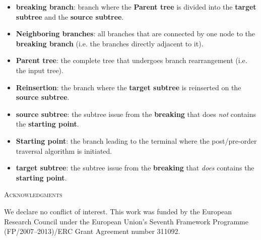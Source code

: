 \documentclass[12pt,letterpaper]{article}
\renewcommand{\section}[1]{%
\bigskip
\begin{center}
\begin{Large}
\normalfont\scshape #1
\medskip
\end{Large}
\end{center}}
\begin{document}
\begin{itemize}
    \item{\textbf{breaking branch}: branch where the \textbf{Parent tree} is divided into the \textbf{target subtree} and the \textbf{source subtree}.}
    \item{\textbf{Neighboring branches}: all branches that are connected by one node to the \textbf{breaking branch} (i.e. the branches directly adjacent to it).}
    \item{\textbf{Parent tree}: the complete tree that undergoes branch rearrangement (i.e. the input tree).}
    \item{\textbf{Reinsertion}: the branch where the \textbf{target subtree} is reinserted on the \textbf{source subtree}.}
    \item{\textbf{source subtree}: the subtree issue from the \textbf{breaking} that does \textit{not} contains the \textbf{starting point}.}
    \item{\textbf{Starting point}: the branch leading to the terminal where the post/pre-order traversal algorithm is initiated.}
    \item{\textbf{target subtree}: the subtree issue from the \textbf{breaking} that \textit{does} contains the \textbf{starting point}.}
\end{itemize}


\section{Acknowledgments}
We declare no conflict of interest. This work was funded by the European Research Council under the European Union’s Seventh Framework Programme (FP/2007–2013)/ERC Grant Agreement number 311092.



\end{document}
